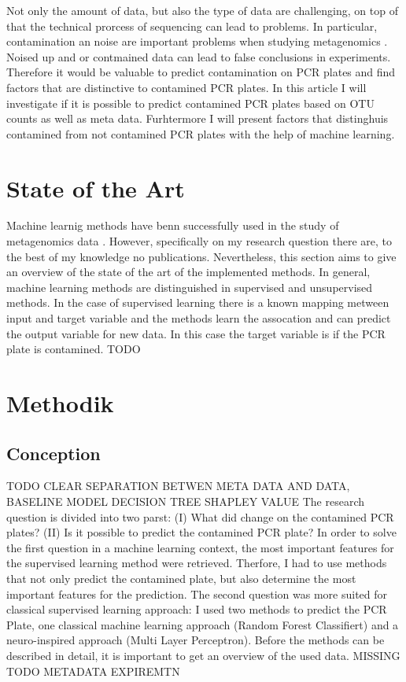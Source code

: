 \documentclass{svproc}
\begin{document}
Not only the amount of data, but also the type of data are challenging, on top of that the technical prorcess of sequencing can lead to problems.
In particular, contamination an noise are important problems when studying metagenomics \cite{paper Michel}. Noised up and or contmained data can lead to false conclusions in experiments. Therefore it would be valuable to predict contamination on PCR plates and find factors that are distinctive to contamined PCR plates. In this article I will investigate if it is possible to predict contamined PCR plates based on OTU counts as well as meta data. Furhtermore I will present factors that distinghuis contamined from not contamined PCR plates with the help of machine learning.


\section{State of the Art}
Machine learnig methods have benn successfully used in the study of metagenomics data  \cite{paperrunde}. However, specifically on my research question there are, to the best of my knowledge no publications. Nevertheless, this section aims to give an overview of the state of the art of the implemented methods. In general, machine learning methods are distinguished in supervised and unsupervised methods. In the case of supervised learning there is a known mapping metween input and target variable and the methods learn the assocation and can predict the output variable for new data. In this case the target variable is if the PCR plate is contamined.
TODO

 
%
%
\section{Methodik}
%
\subsection{Conception}
TODO CLEAR SEPARATION BETWEN META DATA AND DATA, BASELINE MODEL DECISION TREE SHAPLEY VALUE
The research question is divided into two parst: (I) What did change on the contamined PCR plates? (II) Is it possible to predict the contamined PCR plate?
In order to solve the first question in a machine learning context, the most important features for the supervised learning method were retrieved. Therfore, I had to use methods that not only predict the contamined plate, but also determine the most important features for the prediction. The second question was more suited for classical supervised learning approach: I used two methods to predict the PCR Plate, one classical machine learning approach (Random Forest Classifiert) and a neuro-inspired approach (Multi Layer Perceptron). Before the methods can be described in detail, it is important to get an overview of the used data.
 MISSING TODO METADATA EXPIREMTN
\end{document}
